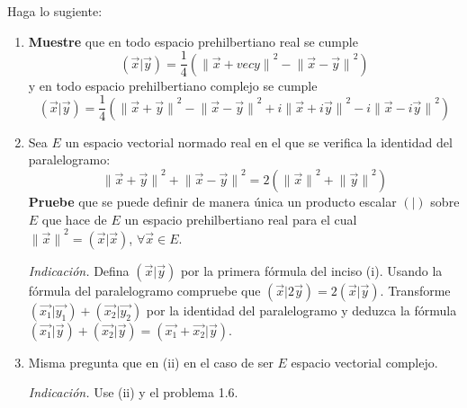 \documentclass[12pt]{report}
\theoremstyle{largebreak}
\newcommand\pint[2]{\ensuremath{\left(#1\big|#2\right)}}
\newcommand\norm[1]{\ensuremath{\|#1\|}}
\begin{document}
    \begin{excer}
        Haga lo sugiente:
        \begin{enumerate}
            \item \textbf{Muestre} que en todo espacio prehilbertiano real se cumple
            \begin{equation*}
                \pint{\vec{x}}{\vec{y}}=\frac{1}{4}\left(\norm{\vec{x}+vec{y}}^2-\norm{\vec{x}-\vec{y}}^2 \right)
            \end{equation*}
            y en todo espacio prehilbertiano complejo se cumple
            \begin{equation*}
                \pint{\vec{x}}{\vec{y}}=\frac{1}{4}\left(\norm{\vec{x}+\vec{y}}^2-\norm{\vec{x}-\vec{y}}^2+i\norm{\vec{x}+i\vec{y}}^2-i\norm{\vec{x}-i\vec{y}}^2 \right)
            \end{equation*}
            \item Sea $E$ un espacio vectorial normado real en el que se verifica la identidad del paralelogramo:
            \begin{equation*}
                \norm{\vec{x}+\vec{y}}^2+\norm{\vec{x}-\vec{y}}^2=2(\norm{\vec{x}}^2+\norm{\vec{y}}^2)
            \end{equation*}
            \textbf{Pruebe} que se puede definir de manera única un producto escalar $\pint{ }{ }$ sobre $E$ que hace de $E$ un espacio prehilbertiano real para el cual $\norm{\vec{x}}^2=\pint{\vec{x}}{\vec{x}}$, $\forall\vec{x}\in E$.

            \textit{Indicación.} Defina $\pint{\vec{x}}{\vec{y}}$ por la primera fórmula del inciso (i). Usando la fórmula del paralelogramo compruebe que $\pint{\vec{x}}{2\vec{y}}=2\pint{\vec{x}}{\vec{y}}$. Transforme $\pint{\vec{x_1}}{\vec{y_1}}+\pint{\vec{x_2}}{\vec{y_2}}$ por la identidad del paralelogramo y deduzca la fórmula $\pint{\vec{x_1}}{\vec{y}}+\pint{\vec{x_2}}{\vec{y}}=\pint{\vec{x_1}+\vec{x_2}}{\vec{y}}$.

            \item Misma pregunta que en (ii) en el caso de ser $E$ espacio vectorial complejo. 
            
            \textit{Indicación.} Use (ii) y el problema 1.6.
        \end{enumerate}
    \end{excer}

    \begin{sol}
        
    \end{sol}
\end{document}

